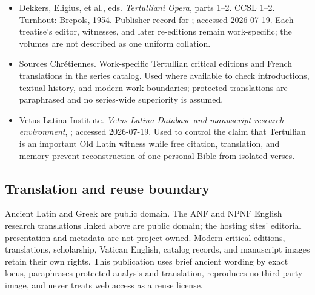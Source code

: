 \begin{itemize}
\item Dekkers, Eligius, et al., eds. \emph{Tertulliani Opera}, parts 1--2. CCSL
1--2. Turnhout: Brepols, 1954. Publisher record for
; accessed
2026-07-19. Each treatise's editor, witnesses, and later re-editions remain
work-specific; the volumes are not described as one uniform collation.

\item Sources Chr\'etiennes. Work-specific Tertullian critical editions and
French translations in the series catalog. Used where available to check
introductions, textual history, and modern work boundaries; protected
translations are paraphrased and no series-wide superiority is assumed.

\item Vetus Latina Institute. \emph{Vetus Latina Database and manuscript
research environment},
; accessed
2026-07-19. Used to control the claim that Tertullian is an important Old Latin
witness while free citation, translation, and memory prevent reconstruction of
one personal Bible from isolated verses.
\end{itemize}

\subsection{Translation and reuse boundary}

Ancient Latin and Greek are public domain. The ANF and NPNF English research
translations linked above are public domain; the hosting sites' editorial
presentation and metadata are not project-owned. Modern critical editions,
translations, scholarship, Vatican English, catalog records, and manuscript
images retain their own rights. This publication uses brief ancient wording by
exact locus, paraphrases protected analysis and translation, reproduces no
third-party image, and never treats web access as a reuse license.

\endgroup
